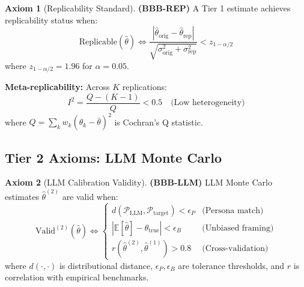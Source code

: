 \documentclass[11pt,a4paper]{article}
\theoremstyle{definition}
\newtheorem{axiom}{Axiom}[section]
\begin{document}
\begin{axiom}[Replicability Standard]
\label{ax:bbb-rep}
\textbf{(BBB-REP)} A Tier 1 estimate achieves replicability status when:
\begin{equation}
\text{Replicable}(\hat{\theta}) \Leftrightarrow 
\frac{|\hat{\theta}_{\text{orig}} - \hat{\theta}_{\text{rep}}|}{\sqrt{\sigma^2_{\text{orig}} + \sigma^2_{\text{rep}}}} < z_{1-\alpha/2}
\end{equation}
where $z_{1-\alpha/2} = 1.96$ for $\alpha = 0.05$.

\textbf{Meta-replicability:} Across $K$ replications:
\begin{equation}
I^2 = \frac{Q - (K-1)}{Q} < 0.5 \quad \text{(Low heterogeneity)}
\end{equation}
where $Q = \sum_k w_k (\hat{\theta}_k - \bar{\theta})^2$ is Cochran's Q statistic.
\end{axiom}

\subsection{Tier 2 Axioms: LLM Monte Carlo}

\begin{axiom}[LLM Calibration Validity]
\label{ax:bbb-llm-full}
\textbf{(BBB-LLM)} LLM Monte Carlo estimates $\hat{\theta}^{(2)}$ are valid when:
\begin{equation}
\text{Valid}^{(2)}(\hat{\theta}) \Leftrightarrow 
\begin{cases}
d(\mathcal{P}_{\text{LLM}}, \mathcal{P}_{\text{target}}) < \epsilon_P & \text{(Persona match)} \\
|\mathbb{E}[\hat{\theta}] - \theta_{\text{true}}| < \epsilon_B & \text{(Unbiased framing)} \\
r(\hat{\theta}^{(2)}, \hat{\theta}^{(1)}) > 0.8 & \text{(Cross-validation)}
\end{cases}
\end{equation}
where $d(\cdot, \cdot)$ is distributional distance, $\epsilon_P, \epsilon_B$ are 
tolerance thresholds, and $r$ is correlation with empirical benchmarks.
\end{axiom}
\end{document}
